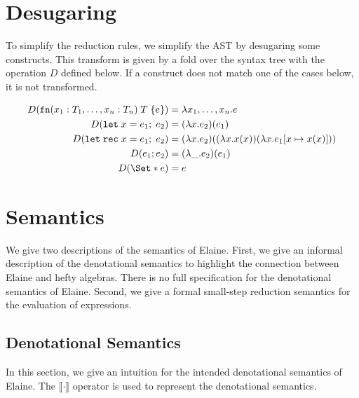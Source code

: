 \section{Desugaring}
To simplify the reduction rules, we simplify the AST by desugaring some constructs. This transform is given by a fold over the syntax tree with the operation $D$ defined below. If a construct does not match one of the cases below, it is not transformed.

\begin{align*}
    D(\fn(x_1: T_1, \dots, x_n: T_n)\;T\;\{e\}) &= \lambda x_1,\dots,x_n . e \\
    D(\kw{let}\;x = e_1;\;e_2) &= (\lambda x . e_2)(e_1)\\
    D(\kw{let}\;\kw{rec}\;x = e_1;\;e_2) &= (\lambda x . e_2)((\lambda x . x(x))(\lambda x. e_1[x\mapsto x(x)]))\\
    D(e_1; e_2) &= (\lambda \_ . e_2)(e_1)\\
    D(\S{e}) &= e\\
\end{align*}

\section{Semantics}\label{sec:semantics}
\newcommand{\reduce}{\quad\longrightarrow\quad}

We give two descriptions of the semantics of Elaine. First, we give an informal description of the denotational semantics to highlight the connection between Elaine and hefty algebras. There is no full specification for the denotational semantics of Elaine. Second, we give a formal small-step reduction semantics for the evaluation of expressions.

\subsection{Denotational Semantics}\label{ssec:denosem}
\newcommand\BB[1]{\left\llbracket\mcode{#1}\right\rrbracket}
\newcommand\bb[1]{\left\llbracket\mcode{#1}\right\rrbracket}

In this section, we give an intuition for the intended denotational semantics of Elaine. The $\llbracket\cdot\rrbracket$ operator is used to represent the denotational semantics.

